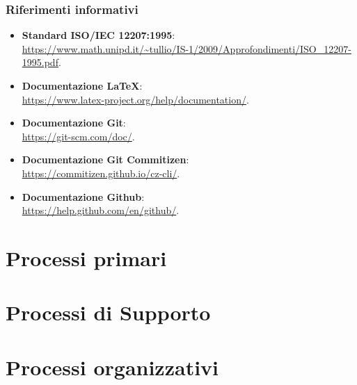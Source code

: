 \documentclass{article}
\begin{document}
\subsubsection{Riferimenti informativi}
\begin{itemize}
  \item \textbf{Standard ISO/IEC 12207:1995}: \\ \href{https://www.math.unipd.it/~tullio/IS-1/2009/Approfondimenti/ISO_12207-1995.pdf}{https://www.math.unipd.it/\textasciitilde tullio/IS-1/2009/Approfondimenti/ISO\_12207-1995.pdf}.
\item \textbf{Documentazione \LaTeX}: \\ \href{https://www.latex-project.org/help/documentation/}{https://www.latex-project.org/help/documentation/}.
\item \textbf{Documentazione Git}: \\ \href{https://git-scm.com/doc/}{https://git-scm.com/doc/}.
\item \textbf{Documentazione Git Commitizen}: \\ \href{https://commitizen.github.io/cz-cli/}{https://commitizen.github.io/cz-cli/}.
\item \textbf{Documentazione Github}: \\ \href{https://help.github.com/en/github/}{https://help.github.com/en/github/}.
\end{itemize}

\newpage

\section{Processi primari}%
\label{sec:processi-primari}


\newpage

\section{Processi di Supporto}%
\label{sec:processi-primari}


\newpage

\section{Processi organizzativi}%
\label{sec:processi-primari}

\end{document}
